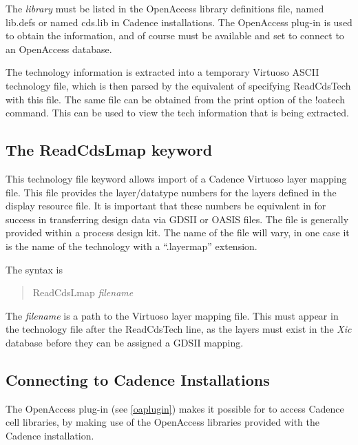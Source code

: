 The {\it library} must be listed in the OpenAccess library
definitions file, named {\vt lib.defs} or named {\vt cds.lib} in
Cadence installations.  The OpenAccess plug-in is used to obtain the
information, and of course must be available and set to connect to an
OpenAccess database.
 
The technology information is extracted into a temporary Virtuoso
ASCII technology file, which is then parsed by the equivalent of
specifying {\vt ReadCdsTech} with this file.  The same file can be
obtained from the print option of the {\cb !oatech} command.  This
can be used to view the tech information that is being extracted.
\fi


\subsection{The {\vt ReadCdsLmap} keyword}
This technology file keyword allows import of a Cadence Virtuoso layer
mapping file.  This file provides the layer/datatype numbers for the
layers defined in the display resource file.  It is important that
these numbers be equivalent in {\Xic} for success in transferring
design data via GDSII or OASIS files.  The file is generally provided
within a process design kit.  The name of the file will vary, in one
case it is the name of the technology with a ``{\vt .layermap}''
extension. 

The syntax is 
\begin{quote}
{\vt ReadCdsLmap} {\it filename}
\end{quote}
       
The {\it filename} is a path to the Virtuoso layer mapping file.  This
must appear in the {\Xic} technology file after the {\vt ReadCdsTech}
line, as the layers must exist in the {\it Xic} database before they
can be assigned a GDSII mapping. 

\ifoa
\subsection{Connecting to Cadence Installations}

The OpenAccess plug-in (see \ref{oaplugin}) makes it possible for
{\Xic} to access Cadence cell libraries, by making use of the
OpenAccess libraries provided with the Cadence installation.

